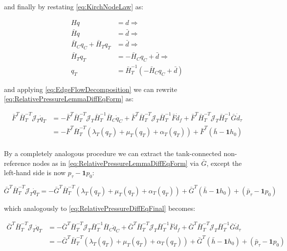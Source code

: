 and finally by restating \cref{eq:KirchNodeLaw} as:

\begin{equation}\label{eq:MassConservationPartitioned}
	\begin{split}
	H q &= d \Rightarrow \\  
	\bar{H}q &= \bar{d} \Rightarrow \\
	\bar{H}_C q_C + \bar{H}_T q_T &= \bar{d} \Rightarrow \\
	\bar{H}_T q_T &= -\bar{H}_C q_C + \bar{d} \Rightarrow	\\
	q_T &= \bar{H}_T^{-1}(-\bar{H}_C q_C + \bar{d})
	\end{split}
\end{equation}

and applying \cref{eq:EdgeFlowDecomposition} we can rewrite \cref{eq:RelativePressureLemmaDiffEqForm} as:

\begin{equation}\label{eq:RelativePressureDiffEqFinal}
	\begin{split}
	\bar{F}^T\bar{H}_T^{-T}\mathcal{J}_T\dot{q}_T &= 
	-\bar{F}^T\bar{H}_T^{-T}\mathcal{J}_T\bar{H}_T^{-1}\bar{H}_C\dot{q}_C + \bar{F}^T\bar{H}_T^{-T}\mathcal{J}_T\bar{H}_T^{-1}\bar{F}\dot{d}_f + \bar{F}^T\bar{H}_T^{-T}\mathcal{J}_T\bar{H}_T^{-1}\bar{G}\dot{d}_{\tau} \\
	&= -\bar{F}^T\bar{H}_T^{-T}(\lambda_T(q_T)+\mu_T(q_T) + \alpha_T(q_T)) + 
	\bar{F}^T(\bar{h} - \mathbf{1}h_0) \\	
	\end{split}
\end{equation}

By a completely analogous procedure we can extract the tank-connected non-reference nodes as in \cref{eq:RelativePressureLemmaDiffEqForm} via $\bar{G}$, except the left-hand side is now $p_{\tau}-\mathbf{1}p_0$:

\begin{equation}\label{eq:RelativePressureLemmaDiffEqFormG}
	\bar{G}^T\bar{H}_T^{-T}\mathcal{J}_T\dot{q}_T = - 	\bar{G}^T\bar{H}_T^{-T}(\lambda_T(q_T)+\mu_T(q_T) + \alpha_T(q_T)) +
	\bar{G}^T(\bar{h} - \mathbf{1}h_0) +
	(\bar{p}_\tau - \mathbf{1}p_0)
\end{equation}

which analogously to \cref{eq:RelativePressureDiffEqFinal} becomes:

\begin{equation}\label{eq:RelativePressureDiffEqFinalG}
	\begin{split}
		\bar{G}^T\bar{H}_T^{-T}\mathcal{J}_T\dot{q}_T &= 
		-\bar{G}^T\bar{H}_T^{-T}\mathcal{J}_T\bar{H}_T^{-1}\bar{H}_C\dot{q}_C + \bar{G}^T\bar{H}_T^{-T}\mathcal{J}_T\bar{H}_T^{-1}\bar{F}\dot{d}_f + \bar{G}^T\bar{H}_T^{-T}\mathcal{J}_T\bar{H}_T^{-1}\bar{G}\dot{d}_{\tau} \\
		&= -\bar{G}^T\bar{H}_T^{-T}(\lambda_T(q_T)+\mu_T(q_T) + \alpha_T(q_T)) + 
		\bar{G}^T(\bar{h} - \mathbf{1}h_0) +
		(\bar{p}_\tau - \mathbf{1}p_0) \\	
	\end{split}
\end{equation}

